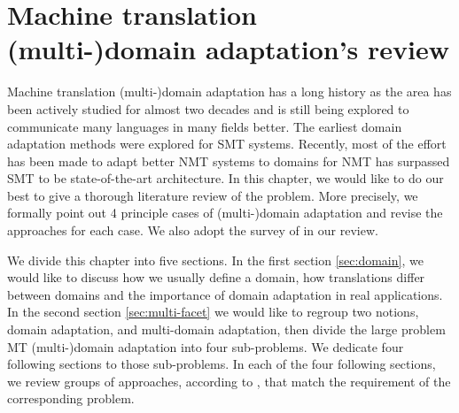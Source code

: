 \chapter{Machine translation (multi-)domain adaptation's review}
Machine translation (multi-)domain adaptation has a long history as the area has been actively studied for almost two decades and is still being explored to communicate many languages in many fields better. The earliest domain adaptation methods were explored for SMT systems. Recently, most of the effort has been made to adapt better NMT systems to domains for NMT has surpassed SMT to be state-of-the-art architecture. In this chapter, we would like to do our best to give a thorough literature review of the problem. More precisely, we formally point out 4 principle cases of (multi-)domain adaptation and revise the approaches for each case. We also adopt the survey of \cite{Chu18asurvey} in our review.

We divide this chapter into five sections. In the first section \ref{sec:domain}, we would like to discuss how we usually define a domain, how translations differ between domains and the importance of domain adaptation in real applications. In the second section \ref{sec:multi-facet} we would like to regroup two notions, domain adaptation, and multi-domain adaptation, then divide the large problem MT (multi-)domain adaptation into four sub-problems. We dedicate four following sections to those sub-problems. In each of the four following sections, we review groups of approaches, according to \citet{Chu18survey}, that match the requirement of the corresponding problem.
